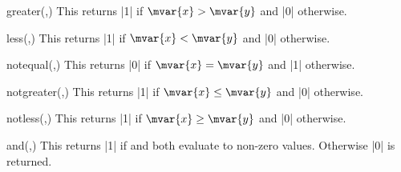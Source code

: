 \begin{math-function}{greater(,)}
\mathcommand
    This returns |1| if $\mvar{x}>\mvar{y}$ and |0| otherwise.
\begin{codeexample}[]
 \pgfmathresult
\end{codeexample}
\end{math-function}

\begin{math-function}{less(,)}
\mathcommand
    This returns |1| if $\mvar{x}<\mvar{y}$ and |0| otherwise.
\begin{codeexample}[]
 \pgfmathresult
\end{codeexample}
\end{math-function}

\begin{math-function}{notequal(,)}
\mathcommand
    This returns |0| if $\mvar{x}=\mvar{y}$ and |1| otherwise.
\begin{codeexample}[]
 \pgfmathresult
\end{codeexample}
\end{math-function}

\begin{math-function}{notgreater(,)}
\mathcommand
    This returns |1| if $\mvar{x}\leq\mvar{y}$ and |0| otherwise.
\begin{codeexample}[]
 \pgfmathresult
\end{codeexample}
\end{math-function}

\begin{math-function}{notless(,)}
\mathcommand
    This returns |1| if $\mvar{x}\geq\mvar{y}$ and |0| otherwise.
\begin{codeexample}[]
 \pgfmathresult
\end{codeexample}
\end{math-function}

\begin{math-function}{and(,)}
\mathcommand
    This returns |1| if  and  both evaluate to non-zero values.
    Otherwise |0| is returned.
\begin{codeexample}[]
 \pgfmathresult
\end{codeexample}
\end{math-function}

